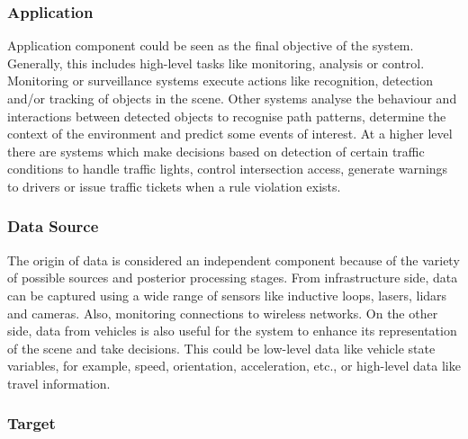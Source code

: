 \documentclass[conference]{IEEEtran}
\begin{document}


\subsubsection{Application}

Application component could be seen as the final objective of the system. Generally, this includes high-level tasks like monitoring, analysis or control. Monitoring or surveillance systems execute actions like recognition, detection and/or tracking of objects in the scene. 
Other systems analyse the behaviour and interactions between detected objects to recognise path patterns, determine the context of the environment and predict some events of interest. At a higher level there are systems which make decisions based on detection of certain traffic conditions to handle traffic lights, control intersection access, generate warnings to drivers or issue traffic tickets when a rule violation exists.

\subsubsection{Data Source}

The origin of data is considered an independent component because of the variety of possible sources and posterior processing stages. From infrastructure side, data can be captured using a wide range of sensors like inductive loops, lasers, lidars and cameras. Also, monitoring connections to wireless networks. On the other side, data from vehicles is also useful for the system to enhance its representation of the scene and take decisions. This could be low-level data like vehicle state variables, for example, speed, orientation, acceleration, etc., or high-level data like travel information.


\subsubsection{Target}
\end{document}
